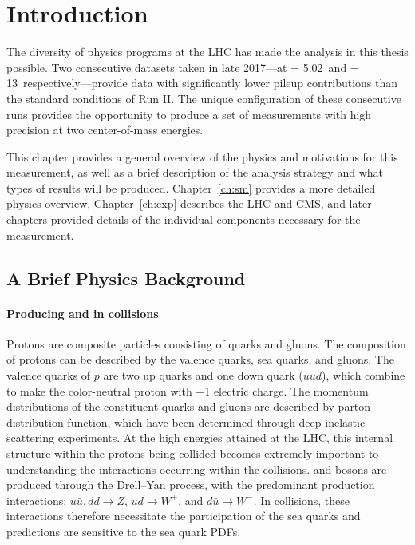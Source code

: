 \chapter{Introduction}

The diversity of physics programs at the LHC has made the analysis  in this thesis possible. Two consecutive datasets taken in late 2017---at \s = 5.02~\TeV and \s = 13~\TeV respectively---provide data with significantly lower pileup contributions than the standard conditions of Run II.  The unique configuration of these consecutive runs provides the opportunity to produce a set of measurements with high precision at two center-of-mass energies. 

This chapter provides a general overview of the physics and motivations for this measurement, as well as a brief description of the analysis strategy and what types of results will be produced. Chapter~\ref{ch:sm} provides a more detailed physics overview, Chapter~\ref{ch:exp} describes the LHC and CMS, and later chapters provided details of the individual components necessary for the measurement.


\section{A Brief Physics Background}

\subsubsection{Producing \W and \Z in \pp collisions}
Protons are composite particles consisting of quarks and gluons. The composition of protons can be described by the valence quarks, sea quarks, and gluons. The valence quarks of $p$ are two up quarks and one down quark ($uud$), which combine to make the color-neutral proton with +1 electric charge. The momentum distributions of the constituent quarks and gluons are described by parton distribution function, which have been determined through deep inelastic scattering experiments. At the high energies attained at the LHC, this internal structure within the protons being collided becomes extremely important to understanding the interactions occurring within the \pp collisions. \W and \Z bosons are produced through the Drell--Yan process, with the predominant production interactions: $u\bar{u}, d\bar{d}\rightarrow Z$,  $u\bar{d}\rightarrow W^+$,  and $d\bar{u}\rightarrow W^-$. In \pp collisions, these interactions therefore necessitate the participation of the sea quarks and predictions are sensitive to the sea quark PDFs.

